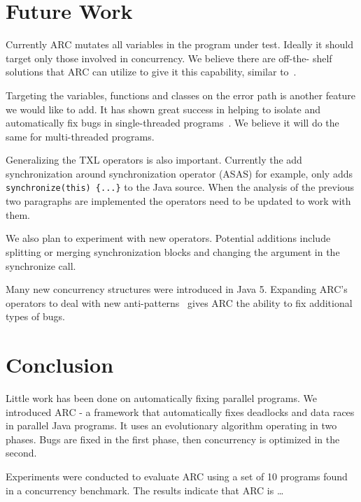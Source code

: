 \documentclass{llncs}
\begin{document}

\section{Future Work}
\label{sec:future_work}

Currently ARC mutates all variables in the program under test. Ideally it
should target only those involved in concurrency. We believe there are off-the-
shelf solutions that ARC can utilize to give it this capability, similar
to~\cite{CM08, HP00}.

Targeting the variables, functions and classes on the error path is another
feature we would like to add. It has shown great success in helping to isolate
and automatically fix bugs in single-threaded programs~\cite{FNWG09, NWLF09,
WFGN10, GNFW11}. We believe it will do the same for multi-threaded programs.

Generalizing the TXL operators is also important. Currently the add
synchronization around synchronization operator (ASAS) for example, only adds
\texttt{synchronize(this) \{...\}} to the Java source. When the analysis of the
previous two paragraphs are implemented the operators need to be updated to
work with them.

We also plan to experiment with new operators. Potential additions include
splitting or merging synchronization blocks and changing the argument in the
synchronize call.

Many new concurrency structures were introduced in Java 5. Expanding ARC's
operators to deal with new anti-patterns~\cite{BJ09, BCD06} gives ARC the
ability to fix additional types of bugs.

\section{Conclusion}
\label{sec:conclusion}

Little work has been done on automatically fixing parallel programs. We
introduced ARC - a framework that automatically fixes deadlocks and data races
in parallel Java programs. It uses an evolutionary algorithm operating in two
phases. Bugs are fixed in the first phase, then concurrency is optimized in the
second.

Experiments were conducted to evaluate ARC using a set of 10 programs found in
a concurrency benchmark. The results indicate that ARC is \ldots %



\end{document}
